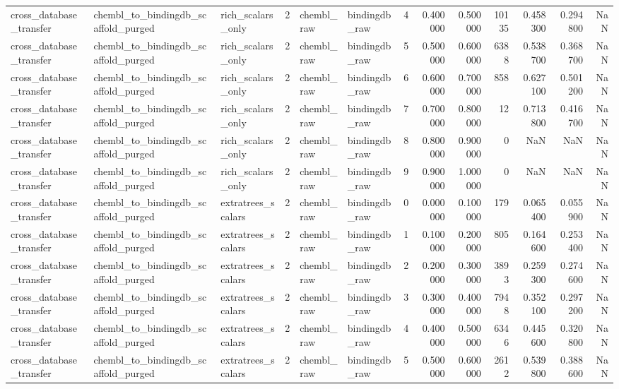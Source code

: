 \begin{longtable}{lllrllrrrrrrr}
cross\_database\_transfer & chembl\_to\_bindingdb\_scaffold\_purged & rich\_scalars\_only & 2 & chembl\_raw & bindingdb\_raw & 4 & 0.400000 & 0.500000 & 10135 & 0.458300 & 0.294800 & NaN \\
cross\_database\_transfer & chembl\_to\_bindingdb\_scaffold\_purged & rich\_scalars\_only & 2 & chembl\_raw & bindingdb\_raw & 5 & 0.500000 & 0.600000 & 6388 & 0.538700 & 0.368700 & NaN \\
cross\_database\_transfer & chembl\_to\_bindingdb\_scaffold\_purged & rich\_scalars\_only & 2 & chembl\_raw & bindingdb\_raw & 6 & 0.600000 & 0.700000 & 858 & 0.627100 & 0.501200 & NaN \\
cross\_database\_transfer & chembl\_to\_bindingdb\_scaffold\_purged & rich\_scalars\_only & 2 & chembl\_raw & bindingdb\_raw & 7 & 0.700000 & 0.800000 & 12 & 0.713800 & 0.416700 & NaN \\
cross\_database\_transfer & chembl\_to\_bindingdb\_scaffold\_purged & rich\_scalars\_only & 2 & chembl\_raw & bindingdb\_raw & 8 & 0.800000 & 0.900000 & 0 & NaN & NaN & NaN \\
cross\_database\_transfer & chembl\_to\_bindingdb\_scaffold\_purged & rich\_scalars\_only & 2 & chembl\_raw & bindingdb\_raw & 9 & 0.900000 & 1.000000 & 0 & NaN & NaN & NaN \\
cross\_database\_transfer & chembl\_to\_bindingdb\_scaffold\_purged & extratrees\_scalars & 2 & chembl\_raw & bindingdb\_raw & 0 & 0.000000 & 0.100000 & 179 & 0.065400 & 0.055900 & NaN \\
cross\_database\_transfer & chembl\_to\_bindingdb\_scaffold\_purged & extratrees\_scalars & 2 & chembl\_raw & bindingdb\_raw & 1 & 0.100000 & 0.200000 & 805 & 0.164600 & 0.253400 & NaN \\
cross\_database\_transfer & chembl\_to\_bindingdb\_scaffold\_purged & extratrees\_scalars & 2 & chembl\_raw & bindingdb\_raw & 2 & 0.200000 & 0.300000 & 3893 & 0.259300 & 0.274600 & NaN \\
cross\_database\_transfer & chembl\_to\_bindingdb\_scaffold\_purged & extratrees\_scalars & 2 & chembl\_raw & bindingdb\_raw & 3 & 0.300000 & 0.400000 & 7948 & 0.352100 & 0.297200 & NaN \\
cross\_database\_transfer & chembl\_to\_bindingdb\_scaffold\_purged & extratrees\_scalars & 2 & chembl\_raw & bindingdb\_raw & 4 & 0.400000 & 0.500000 & 6346 & 0.445600 & 0.320800 & NaN \\
cross\_database\_transfer & chembl\_to\_bindingdb\_scaffold\_purged & extratrees\_scalars & 2 & chembl\_raw & bindingdb\_raw & 5 & 0.500000 & 0.600000 & 2612 & 0.539800 & 0.388600 & NaN \\

\end{longtable}

